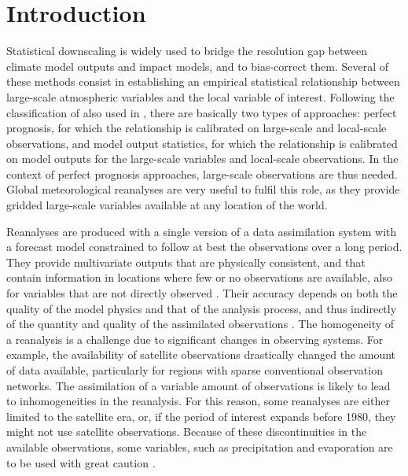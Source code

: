 \documentclass{ametsoc}
\begin{document}



\section{Introduction}

Statistical downscaling is widely used to bridge the resolution gap between climate model outputs and impact models, and to bias-correct them. Several of these methods consist in establishing an empirical statistical relationship between large-scale atmospheric variables and the local variable of interest. Following the classification of \citet{Rummukainen1997} also used in \citet{Maraun2010}, there are basically two types of approaches: perfect prognosis, for which the relationship is calibrated on large-scale and local-scale observations, and model output statistics, for which the relationship is calibrated on model outputs for the large-scale variables and local-scale observations. In the context of perfect prognosis approaches, large-scale observations are thus needed. Global meteorological reanalyses are very useful to fulfil this role, as they provide gridded large-scale variables available at any location of the world.

Reanalyses are produced with a single version of a data assimilation system with a forecast model constrained to follow at best the observations over a long period. They provide multivariate outputs that are physically consistent, and that contain information in locations where few or no observations are available, also for variables that are not directly observed \citep{Gelaro2017}. Their accuracy depends on both the quality of the model physics and that of the analysis process, and thus indirectly of the quantity and quality of the assimilated observations \citep{Dee2011a}. The homogeneity of a reanalysis is a challenge due to significant changes in observing systems. For example, the availability of satellite observations drastically changed the amount of data available, particularly for regions with sparse conventional observation networks. The assimilation of a variable amount of observations is likely to lead to inhomogeneities in the reanalysis. For this reason, some reanalyses are either limited to the satellite era, or, if the period of interest expands before 1980, they might not use satellite observations. Because of these discontinuities in the available observations, some variables, such as precipitation and evaporation are to be used with great caution \citep{Kobayashi2015}.
\end{document}
